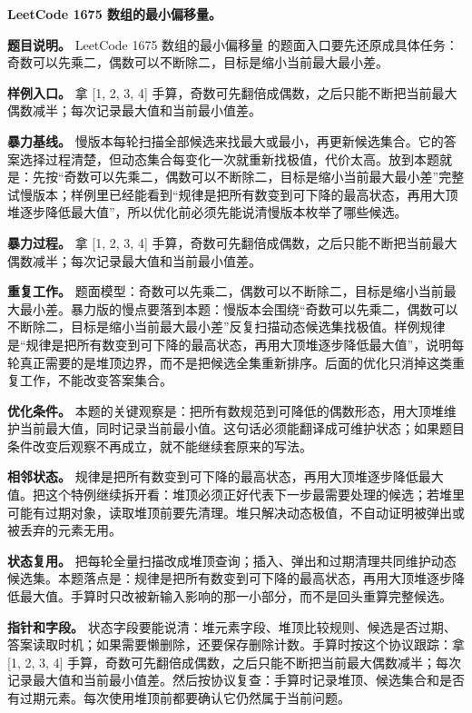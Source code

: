 \noindent\textbf{LeetCode 1675 数组的最小偏移量。}

\textbf{题目说明。} LeetCode 1675 数组的最小偏移量 的题面入口要先还原成具体任务：奇数可以先乘二，偶数可以不断除二，目标是缩小当前最大最小差。

\textbf{样例入口。} 拿 [1, 2, 3, 4] 手算，奇数可先翻倍成偶数，之后只能不断把当前最大偶数减半；每次记录最大值和当前最小值差。

\textbf{暴力基线。} 慢版本每轮扫描全部候选来找最大或最小，再更新候选集合。它的答案选择过程清楚，但动态集合每变化一次就重新找极值，代价太高。放到本题就是：先按“奇数可以先乘二，偶数可以不断除二，目标是缩小当前最大最小差”完整试慢版本；样例里已经能看到“规律是把所有数变到可下降的最高状态，再用大顶堆逐步降低最大值”，所以优化前必须先能说清慢版本枚举了哪些候选。

\textbf{暴力过程。} 拿 [1, 2, 3, 4] 手算，奇数可先翻倍成偶数，之后只能不断把当前最大偶数减半；每次记录最大值和当前最小值差。

\textbf{重复工作。} 题面模型：奇数可以先乘二，偶数可以不断除二，目标是缩小当前最大最小差。暴力版的慢点要落到本题：慢版本会围绕“奇数可以先乘二，偶数可以不断除二，目标是缩小当前最大最小差”反复扫描动态候选集找极值。样例规律是“规律是把所有数变到可下降的最高状态，再用大顶堆逐步降低最大值”，说明每轮真正需要的是堆顶边界，而不是把候选全集重新排序。后面的优化只消掉这类重复工作，不能改变答案集合。

\textbf{优化条件。} 本题的关键观察是：把所有数规范到可降低的偶数形态，用大顶堆维护当前最大值，同时记录当前最小值。这句话必须能翻译成可维护状态；如果题目条件改变后观察不再成立，就不能继续套原来的写法。

\textbf{相邻状态。} 规律是把所有数变到可下降的最高状态，再用大顶堆逐步降低最大值。把这个特例继续拆开看：堆顶必须正好代表下一步最需要处理的候选；若堆里可能有过期对象，读取堆顶前要先清理。堆只解决动态极值，不自动证明被弹出或被丢弃的元素无用。

\textbf{状态复用。} 把每轮全量扫描改成堆顶查询；插入、弹出和过期清理共同维护动态候选集。本题落点是：规律是把所有数变到可下降的最高状态，再用大顶堆逐步降低最大值。手算时只改被新输入影响的那一小部分，而不是回头重算完整候选。

\textbf{指针和字段。} 状态字段要能说清：堆元素字段、堆顶比较规则、候选是否过期、答案读取时机；如果需要懒删除，还要保存删除计数。手算时按这个协议跟踪：拿 [1, 2, 3, 4] 手算，奇数可先翻倍成偶数，之后只能不断把当前最大偶数减半；每次记录最大值和当前最小值差。然后按协议复查：手算时记录堆顶、候选集合和是否有过期元素。每次使用堆顶前都要确认它仍然属于当前问题。

